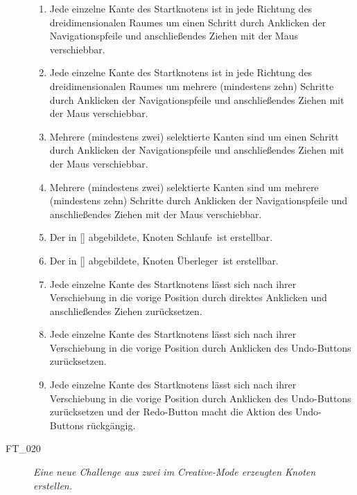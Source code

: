 \begin{description}
\begin{enumerate}
		
		\item Jede einzelne Kante des Startknotens ist in jede Richtung des dreidimensionalen Raumes um einen Schritt durch Anklicken der Navigationspfeile und anschließendes Ziehen mit der Maus verschiebbar.
		\item Jede einzelne Kante des Startknotens ist in jede Richtung des dreidimensionalen Raumes um mehrere (mindestens zehn) Schritte durch Anklicken der Navigationspfeile und anschließendes Ziehen mit der Maus verschiebbar.
		\item Mehrere (mindestens zwei) selektierte Kanten sind um einen Schritt durch Anklicken der Navigationspfeile und anschließendes Ziehen mit der Maus verschiebbar.
		\item Mehrere (mindestens zwei) selektierte Kanten sind um mehrere (mindestens zehn) Schritte durch Anklicken der Navigationspfeile und anschließendes Ziehen mit der Maus verschiebbar.
		
		\item Der in \ref{} abgebildete, Knoten \glqq Schlaufe\grqq~ist erstellbar.
		\item Der in \ref{} abgebildete, Knoten \glqq Überleger\grqq~ist erstellbar.
		
		\item Jede einzelne Kante des Startknotens lässt sich nach ihrer Verschiebung in die vorige Position durch direktes Anklicken und anschließendes Ziehen zurücksetzen.
		\item Jede einzelne Kante des Startknotens lässt sich nach ihrer Verschiebung in die vorige Position durch Anklicken des \glqq Undo\grqq-Buttons zurücksetzen.
		\item Jede einzelne Kante des Startknotens lässt sich nach ihrer Verschiebung in die vorige Position durch Anklicken des \glqq Undo\grqq-Buttons zurücksetzen und der \glqq Redo\grqq-Button macht die Aktion des \glqq Undo\grqq-Buttons rückgängig.
		\\
	
	\end{enumerate}
	
	
	\item[FT\_020] \textit{Eine neue Challenge aus zwei im Creative-Mode erzeugten Knoten erstellen.} \hfill\\
	
	\begin{enumerate} %
	

\end{enumerate}
\end{description}
